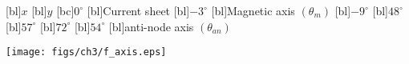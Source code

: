 \begin{psfrags}%
\psfragscanon%
%
[bl]{\tiny{$x$}}%
[bl]{\tiny{$y$}}%
[bc]{\tiny{$0^{\circ}$}}%
[bl]{\tiny{Current sheet}}%
[bl]{\tiny{$-3^{\circ}$}}%
[bl]{\tiny{Magnetic axis $\left(\theta_{m}\right)$}}%
[bl]{\tiny{$-9^{\circ}$}}%
[bl]{\tiny{$48^{\circ}$}}%
[bl]{\tiny{$57^{\circ}$}}%
[bl]{\tiny{$72^{\circ}$}}%
[bl]{\tiny{$54^{\circ}$}}%
[bl]{\tiny{anti-node axis $\left(\theta_{an}\right)$}}%

%
\texttt{[image: figs/ch3/f\_axis.eps]}%
\end{psfrags}
